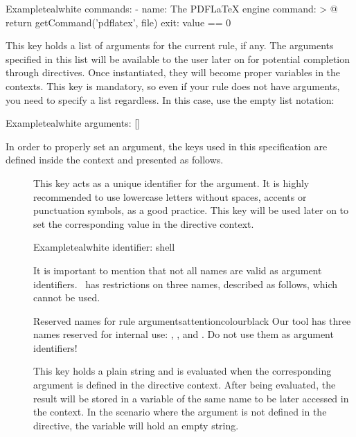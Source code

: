 \begin{description}
\begin{codebox}{Example}{teal}{\icnote}{white}
commands:
- name: The PDFLaTeX engine
  command: >
    @{
      return getCommand('pdflatex', file)
    }
  exit: value == 0
\end{codebox}

\item[\describe{M}{arguments}] This key holds a list of arguments for the current rule, if any. The arguments specified in this list will be available to the user later on for potential completion through directives. Once instantiated, they will become proper variables in the  contexts. This key is mandatory, so even if your rule does not have arguments, you need to specify a list regardless. In this case, use the empty list notation:

\begin{codebox}{Example}{teal}{\icnote}{white}
arguments: []
\end{codebox}

In order to properly set an argument, the keys used in this specification are defined inside the  context and presented as follows.

\begin{description}
\item[] This key acts as a unique identifier for the argument. It is highly recommended to use lowercase letters without spaces, accents or punctuation symbols, as a good practice. This key will be used later on to set the corresponding value in the directive context.

\begin{codebox}{Example}{teal}{\icnote}{white}
identifier: shell
\end{codebox}

It is important to mention that not all names are valid as argument identifiers. \arara\ has restrictions on three names, described as follows, which cannot be used.

\begin{messagebox}{Reserved names for rule arguments}{attentioncolour}{\icattention}{black}
Our tool has three names reserved for internal use: , , and . Do not use them as argument identifiers!
\end{messagebox}

\item[] This key holds a plain string and is evaluated when the corresponding argument is defined in the directive context.  After being evaluated, the result will be stored in a variable of the same name to be later accessed in the  context. In the scenario where the argument is not defined in the directive, the variable will hold an empty string.


\end{description}
\end{description}
